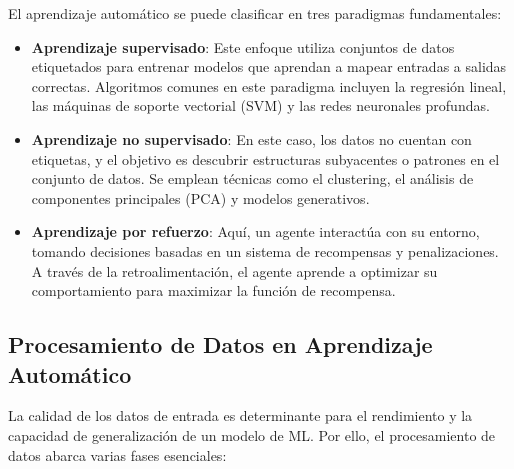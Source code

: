 \documentclass[11pt,spanish,listoffigures,listoftables]{tfgetsinf}
\begin{document}
El aprendizaje automático se puede clasificar en tres paradigmas fundamentales:

\begin{itemize}
    \item \textbf{Aprendizaje supervisado}: Este enfoque utiliza conjuntos de datos etiquetados para entrenar modelos que aprendan a mapear entradas a salidas correctas. Algoritmos comunes en este paradigma incluyen la regresión lineal, las máquinas de soporte vectorial (SVM) y las redes neuronales profundas. 
    
    \item \textbf{Aprendizaje no supervisado}: En este caso, los datos no cuentan con etiquetas, y el objetivo es descubrir estructuras subyacentes o patrones en el conjunto de datos. Se emplean técnicas como el clustering, el análisis de componentes principales (PCA) y modelos generativos.
    
    \item \textbf{Aprendizaje por refuerzo}: Aquí, un agente interactúa con su entorno, tomando decisiones basadas en un sistema de recompensas y penalizaciones. A través de la retroalimentación, el agente aprende a optimizar su comportamiento para maximizar la función de recompensa.
\end{itemize}

\subsection{Procesamiento de Datos en Aprendizaje Automático}

La calidad de los datos de entrada es determinante para el rendimiento y la capacidad de generalización de un modelo de ML. Por ello, el procesamiento de datos abarca varias fases esenciales:
\end{document}
